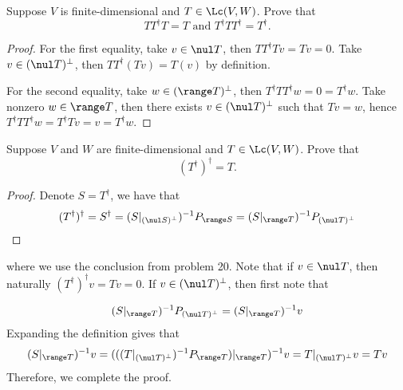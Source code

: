 \documentclass{extarticle}
\begin{document}
\begin{problem}{22}
    Suppose \(V\) is finite-dimensional and \(T \in \Lc(V, W)\). Prove that
    \[TT^\dagger T = T \text{  and  } T^\dagger T T^\dagger = T^\dagger.\]
\end{problem}

\begin{proof}
For the first equality, take \(v \in \nul T\), then \(TT^\dagger T v = Tv = 0\). Take \(v \in (\nul T)^\perp\),
then \(TT^\dagger (Tv) = T(v)\) by definition.

For the second equality, take \(w \in (\range T)^\perp\), then \(T^\dagger T T^\dagger w = 0 = T^\dagger w\).
Take nonzero \(w \in \range T\), then there exists \(v \in (\nul T)^\perp\) such that \(Tv = w\), hence
\(T^\dagger T T^\dagger w = T^\dagger Tv = v = T^\dagger w\).
\end{proof}

\begin{problem}{23}
    Suppose \(V\) and \(W\) are finite-dimensional and \(T \in \Lc(V, W)\). Prove that
    \[(T^\dagger)^\dagger = T.\]
\end{problem}

\begin{proof}
Denote \(S = T^\dagger\), we have that
\[(T^\dagger)^\dagger = S^\dagger = (S|_{(\nul S)^\perp})^{-1} P_{\range S}
= (S|_{\range T})^{-1} P_{(\nul T)^\perp}\]
\end{proof}

where we use the conclusion from problem 20. Note that if \(v \in \nul T\), then naturally
\((T^\dagger)^\dagger v = Tv = 0\). If \(v \in (\nul T)^{\perp}\), then first note that

\[(S|_{\range T})^{-1} P_{(\nul T)^\perp} = (S|_{\range T})^{-1} v \]
Expanding the definition gives that
\[(S|_{\range T})^{-1}v = (((T|_{(\nul T)^\perp})^{-1} P_{\range T})|_{\range T})^{-1} v
= T|_{(\nul T)^\perp}v = Tv\]
Therefore, we complete the proof.
\end{document}

